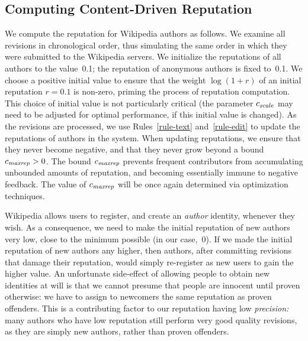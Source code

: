 \subsection{Computing Content-Driven Reputation}

We compute the reputation for Wikipedia authors as follows. 
We examine all revisions in chronological order, thus simulating the
same order in which they were submitted to the Wikipedia servers. 
We initialize the reputations of all authors to the value~0.1;
the reputation of anonymous authors is fixed to~0.1.  
We choose a positive initial value to ensure that the weight
$\log (1+r)$ of an initial reputation $r = 0.1$ is non-zero, priming
the process of reputation computation.  
This choice of initial value is not particularly critical (the
parameter ${c_{{\text{\textit{scale}}}}}$ may need to be adjusted for optimal performance,
if this initial value is changed). 
As the revisions are processed, we use Rules~\ref{rule-text}
and~\ref{rule-edit} to update the reputations of authors in the
system. 
When updating reputations, we ensure that they never become negative,
and that they never grow beyond a bound ${c_{{\text{\textit{maxrep}}}}} > 0$. 
The bound ${c_{{\text{\textit{maxrep}}}}}$ prevents frequent contributors from
accumulating unbounded amounts of reputation, and becoming essentially
immune to negative feedback. 
The value of ${c_{{\text{\textit{maxrep}}}}}$ will be once again determined via
optimization techniques. 

Wikipedia allows users to register, and create an {\em author\/}
identity, whenever they wish. 
As a consequence, we need to make the initial reputation of new authors
very low, close to the minimum possible (in our case,~0). 
If we made the initial reputation of new authors any higher,
then authors, after committing revisions that damage their reputation,
would simply re-register as new users to gain the higher value. 
An unfortunate side-effect of allowing people to obtain new identities
at will is that we cannot presume that people are innocent until
proven otherwise: we have to assign to newcomers the same reputation
as proven offenders. 
This is a contributing factor to our reputation having low 
{\em precision:\/} many authors who have low reputation still perform
very good quality revisions, as they are simply new authors, rather than
proven offenders. 


